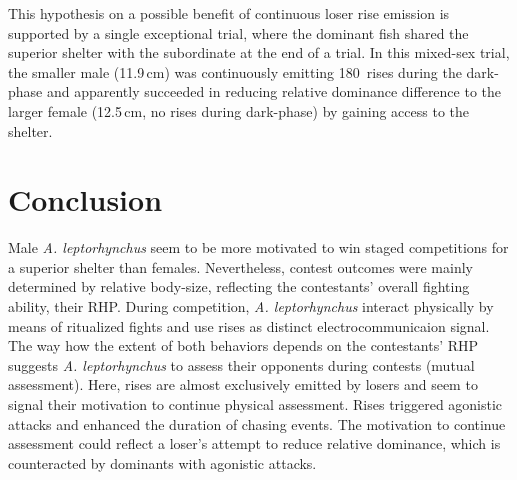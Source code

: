\documentclass[vruler,JEB]{COB}%
\newcommand{\lepto}{\textit{A. leptorhynchus}}
\begin{document}
This hypothesis on a possible benefit of continuous loser rise emission is supported by a single exceptional trial, where the dominant fish shared the superior shelter with the subordinate at the end of a trial. In this mixed-sex trial, the smaller male (11.9\,cm) was continuously emitting 180~rises during the dark-phase and apparently succeeded in reducing relative dominance difference to the larger female (12.5\,cm, no rises during dark-phase) by gaining access to the shelter.

\section{Conclusion}
Male \lepto{} seem to be more motivated to win staged competitions for a superior shelter than females. Nevertheless, contest outcomes were mainly determined by relative body-size, reflecting the contestants' overall fighting ability, their RHP.  During competition, \lepto{} interact physically by means of ritualized fights and use rises as distinct electrocommunicaion signal. The way how the extent of both behaviors depends on the contestants' RHP suggests \lepto{} to assess their opponents during contests (mutual assessment). Here, rises are almost exclusively emitted by losers and seem to signal their motivation to continue physical assessment. Rises triggered agonistic attacks and enhanced the duration of chasing events. The motivation to continue assessment could reflect a loser's attempt to reduce relative dominance, which is counteracted by dominants with agonistic attacks.






\end{document}
